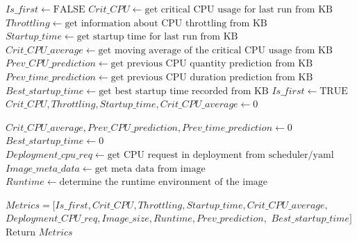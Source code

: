 
\begin{algorithm}
\caption{ANALYZE ($image\_name$)}\label{alg:cap}
\begin{algorithmic}
      \State ${Is\_first} \gets \text{FALSE}$
    \State ${Crit\_CPU} \gets \text{get critical CPU usage for last run from KB}$
    \State ${Throttling } \gets \text{get information about CPU throttling from KB}$
    \State ${Startup\_time} \gets \text{get startup time for last run from KB}$
    \State ${Crit\_CPU\_average} \gets \text{get moving average of the critical CPU usage from KB}$
    \State ${Prev\_CPU\_prediction} \gets \text{get previous CPU quantity prediction from KB}$
    \State ${Prev\_time\_prediction} \gets \text{get previous CPU duration prediction from KB}$
    \State ${Best\_startup\_time} \gets \text{get best startup time recorded from KB}$
\Else
    \State ${Is\_first} \gets \text{TRUE}$
    \State ${Crit\_CPU,Throttling,Startup\_time,Crit\_CPU\_average} \gets \text{0}$
    
    \State ${Crit\_CPU\_average,Prev\_CPU\_prediction,Prev\_time\_prediction} \gets \text{0}$
    \State${Best\_startup\_time} \gets \text{0}$
\EndIf
\State ${Deployment\_cpu\_req } \gets \text {get CPU request in deployment from scheduler/yaml}$ 
\State ${Image\_meta\_data } \gets \text{get meta data from image}$
\State ${Runtime} \gets \text{determine the runtime environment of the image}$

\State ${Metrics = [Is\_first, Crit\_CPU, Throttling, Startup\_time, Crit\_CPU\_average,}$
\State \hspace{58pt} ${Deployment\_CPU\_req, Image\_size, Runtime, Prev\_prediction,}$
\State \hspace{58pt} ${Best\_startup\_time]}$
\State $\text{Return } Metrics$
\end{algorithmic}
\end{algorithm}
